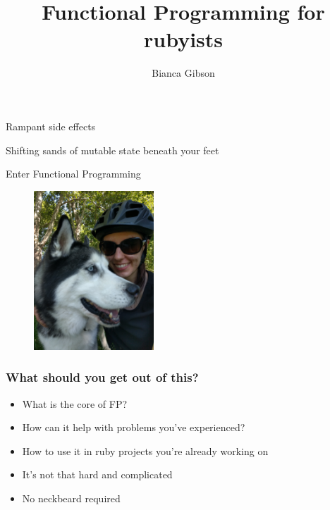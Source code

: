 \documentclass[aspectratio=169]{beamer}
\title{Functional Programming for rubyists}
\author{Bianca Gibson}
\institute{Ruby Conf AU 2016}
\date{}
\begin{document}
\frame{\titlepage}

\begin{frame}
  \begin{center}
    \Huge Rampant side effects
  \end{center}
\end{frame}

\begin{frame}
  \begin{center}
    \Huge Shifting sands of mutable state beneath your feet
  \end{center}
\end{frame}

\begin{frame}
  \begin{center}
    \Huge Enter Functional Programming
  \end{center}
\end{frame}

\begin{frame}
  \begin{figure}[p]
    \includegraphics[width=0.4\textwidth]{./assets/portrait.jpg}
  \end{figure}
\end{frame}

\begin{frame}
  \frametitle{What should you get out of this?}
  \begin{itemize}
    \item What is the core of FP?
    \item How can it help with problems you've experienced?
    \item How to use it in ruby projects you're already working on
    \item It's not that hard and complicated
    \item No neckbeard required
  \end{itemize}
\end{frame}
\end{document}
